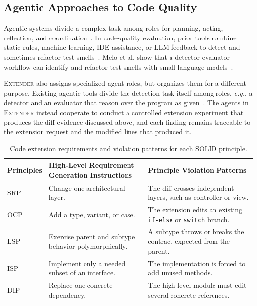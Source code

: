 \documentclass[sigconf,screen]{acmart}
\newcommand{\tool}{\textsc{Extender}\xspace}
\newcommand{\eg}{{\em e.g.},\xspace}
\begin{document}
\subsection{Agentic Approaches to Code Quality}

Agentic systems divide a complex task among roles for planning, acting, reflection, and coordination~\cite{Wang2024,Yao2023}.  
In code-quality evaluation, prior tools combine static rules, machine learning, IDE assistance, or LLM feedback to detect and sometimes refactor test smells~\cite{Aljedaani2021,Pontillo2024,Wang2021,Lambiase2020,Lucas2024}.
Melo et al. show that a detector-evaluator workflow can identify and refactor test smells with small language models~\cite{Melo2025}.

\tool also assigns specialized agent roles, but organizes them for a different purpose.
Existing agentic tools divide the detection task itself among roles, \eg a detector and an evaluator that reason over the program as given~\cite{Melo2025}.
The agents in \tool instead cooperate to conduct a controlled extension experiment that produces the diff evidence discussed above, and each finding remains traceable to the extension request and the modified lines that produced it.

\begin{table}[t]
  \centering
  \caption{Code extension requirements and violation patterns for each SOLID principle.}\label{tab:patterns}
  \vspace{-0.1in}
  \small
  \begin{tabular}{p{}p{}p{}}
    \toprule
    \textbf{Principles} & \textbf{High-Level Requirement Generation Instructions} & \textbf{Principle Violation Patterns} \\
    \midrule
    SRP & Change one architectural layer. & The diff crosses independent layers,
    such as controller or view. \\
    OCP & Add a type, variant, or case. & The extension edits an existing
    \texttt{if-else} or \texttt{switch} branch. \\
    LSP & Exercise parent and subtype behavior polymorphically. & A subtype throws
    or breaks the contract expected from the parent. \\
    ISP & Implement only a needed subset of an interface. & The implementation is
    forced to add unused methods. \\
    DIP & Replace one concrete dependency. & The high-level module must edit several concrete references. \\
    \bottomrule
  \end{tabular}
  \vspace{-0.1in}
\end{table}
\end{document}
